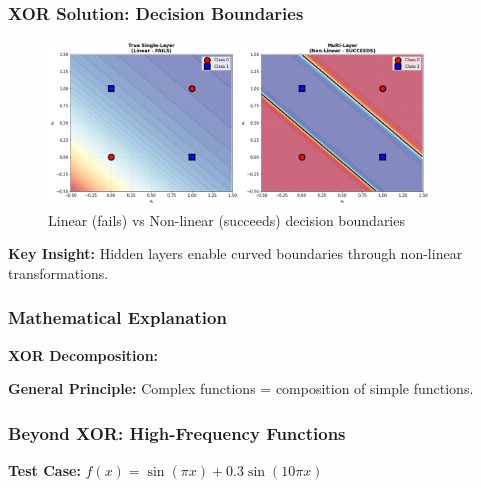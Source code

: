 \documentclass[notes]{beamer}
\begin{document}
\begin{frame}
\begin{frame}
\end{frame}

\begin{frame}
\frametitle{XOR Solution: Decision Boundaries}

\begin{figure}[ht]
	\centering
	\includegraphics[width=0.9\textwidth]{figs/xor-decision-boundaries.png}
	\caption*{Linear (fails) vs Non-linear (succeeds) decision boundaries}
\end{figure}

\textbf{Key Insight:} Hidden layers enable curved boundaries through non-linear transformations.

\end{frame}

\begin{frame}
\frametitle{Mathematical Explanation}

\textbf{XOR Decomposition:}

\textbf{General Principle:} Complex functions = composition of simple functions.

\end{frame}

\begin{frame}
\frametitle{Beyond XOR: High-Frequency Functions}

\textbf{Test Case:} $f(x) = \sin(\pi x) + 0.3\sin(10\pi x)$


\end{frame}
\end{frame}
\end{document}
